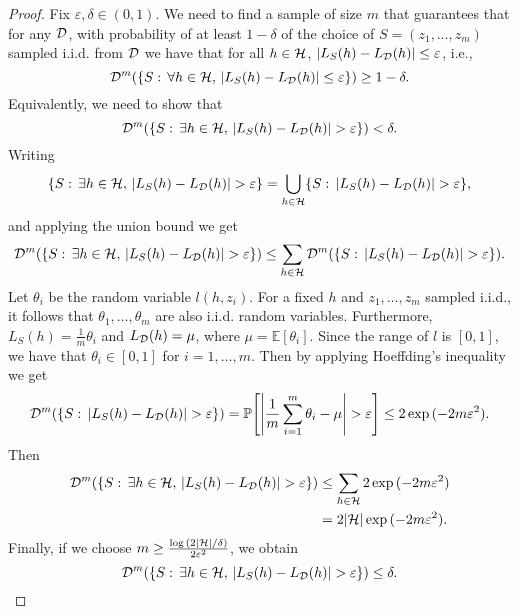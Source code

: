 \documentclass[11pt,a4paper]{article}
\begin{document}
\begin{proof}
Fix $\varepsilon,\delta\in(0,1)$. We need to find a sample of size $m$ that guarantees that for any $\mathcal{D}$, with probability of at least $1-\delta$ of the choice of $S = (z_1,\ldots,z_m)$ sampled i.i.d. from $\mathcal{D}$ we have that for all $h\in\mathcal{H}$, $|L_S(h)-L_{\mathcal{D}}(h)|\le \varepsilon$, i.e.,
\begin{equation*}
\mathcal{D}^m(\{S:\,\forall h\in\mathcal{H},\,|L_S(h)-L_{\mathcal{D}}(h)|\le \varepsilon\}) \ge 1-\delta.
\end{equation*}
Equivalently, we need to show that 
\begin{equation*}
\Dist^m(\{S:\,\exists h\in\h,\,|L_S(h)-L_\Dist(h)|> \varepsilon\}) < \delta.
\end{equation*}
Writing
\begin{equation*}
\{S:\,\exists h\in\h,\,|L_S(h)-L_\Dist(h)|> \varepsilon\} = \bigcup_{h\in\h} \{S:\,|L_S(h)-L_\Dist(h)|> \varepsilon\},
\end{equation*}
and applying the union bound we get
\begin{equation*}
\Dist^m(\{S:\,\exists h\in\h,\,|L_S(h)-L_\Dist(h)|> \varepsilon\}) \le 
\sum_{h\in\h} \Dist^m(\{S:\,|L_S(h)-L_\Dist(h)|> \varepsilon\}).
\end{equation*}
Let $\theta_i$ be the random variable $l(h,z_i)$. For a fixed $h$ and $z_1,\ldots,z_m$ sampled i.i.d., it follows that $\theta_1,\ldots,\theta_m$ are also i.i.d. random variables. Furthermore, $L_S(h) = \frac{1}{m}\theta_i$ and $L_{\mathcal{D}}(h) = \mu$, where $\mu = \mathbb{E}[\theta_i]$. Since the range of $l$ is $[0,1]$, we have that $\theta_i\in [0,1]$ for $i = 1,\ldots,m$. Then by applying Hoeffding's inequality we get
\begin{equation*}
\Dist^m(\{S:\,|L_S(h)-L_\Dist(h)|> \varepsilon\}) = \Prob\Bigg[ \Bigg| \dfrac{1}{m}\sum_{i=1}^m\theta_i - \mu \Bigg|>\varepsilon \Bigg] \le 2 \exp{(-2m\varepsilon^2)}.
\end{equation*}
Then
\begin{align*}
\Dist^m(\{S:\,\exists h\in\h,\,|L_S(h)-L_\Dist(h)|> \varepsilon\}) &\le 
\sum_{h\in\h} 2 \exp{(-2m\varepsilon^2)} \\
&= 2|\h| \exp{(-2m\varepsilon^2)}.
\end{align*}
Finally, if we choose $m\ge \frac{\log{(2|\mathcal{H}|/\delta)}}{2\varepsilon^2}$, we obtain
\begin{equation*}
\Dist^m(\{S:\,\exists h\in\h,\,|L_S(h)-L_\Dist(h)|> \varepsilon\}) \le \delta.
\end{equation*}
\end{proof}
\end{document}
